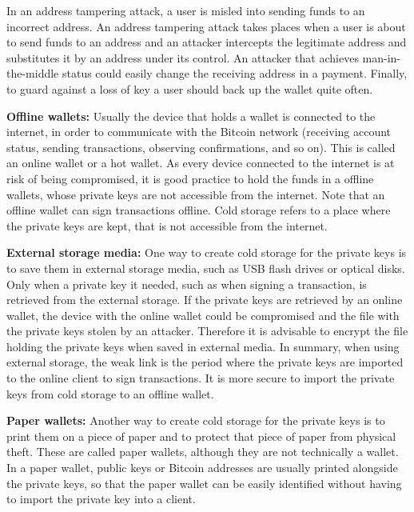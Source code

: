 \documentclass{article}
\begin{document}
In an address tampering attack, a user is misled into sending funds to an incorrect address. An address tampering attack takes places when a user is about to send funds to an address and an attacker intercepts the legitimate address and substitutes it by an address under its control. An attacker that achieves man-in-the-middle status could easily change the receiving address in a payment.\newline
Finally, to guard against a loss of key a user should back up the wallet quite often.\par\noindent 
\textbf{Offline wallets:} Usually the device that holds a wallet is connected to the internet, in order to communicate with the Bitcoin network (receiving account status, sending transactions, observing confirmations, and so on). This is called an online wallet or a hot wallet. As every device connected to the internet is at risk of being compromised, it is good practice to hold the funds in a offline wallets, whose private keys are not accessible from the internet. Note that an offline wallet can sign transactions offline. Cold storage refers to a place where the private keys are kept, that is not accessible from the internet.\par\noindent
\textbf{External storage media:} One way to create cold storage for the private keys is to save them in external storage media, such as USB flash drives or optical disks. Only when a private key it needed, such as when signing a transaction, is retrieved from the external storage.\newline
If the private keys are retrieved by an online wallet, the device with the online wallet could be compromised and the file with the private keys stolen by an attacker. Therefore it is advisable to encrypt the file holding the private keys when saved in external media.\newline
In summary, when using external storage, the weak link is the period where the private keys are imported to the online client to sign transactions. It is more secure to import the private keys from cold storage to an offline wallet.\par\noindent
\textbf{Paper wallets:} Another way to create cold storage for the private keys is to print them on a piece of paper and to protect that piece of paper from physical theft. These are called paper wallets, although they are not technically a wallet. In a paper wallet, public keys or Bitcoin addresses are usually printed alongside the private keys, so that the paper wallet can be easily identified without having to import the private key into a client.\newline
\end{document}
